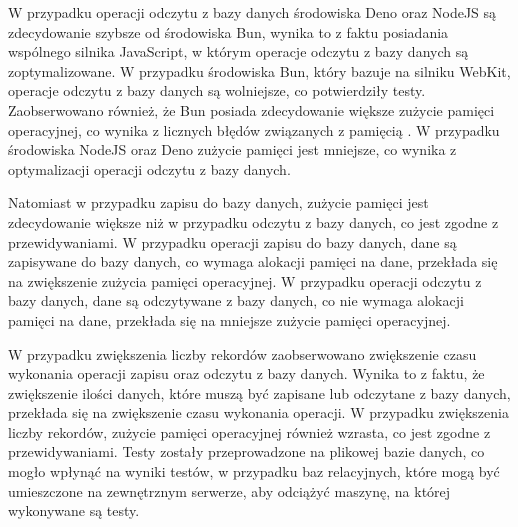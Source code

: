 W przypadku operacji odczytu z bazy danych środowiska Deno oraz NodeJS są zdecydowanie szybsze od środowiska Bun, wynika to z faktu posiadania wspólnego silnika JavaScript, w którym operacje odczytu z bazy danych są zoptymalizowane. W przypadku środowiska Bun, który bazuje na silniku WebKit, operacje odczytu z bazy danych są wolniejsze, co potwierdziły testy. Zaobserwowano również, że Bun posiada zdecydowanie większe zużycie pamięci operacyjnej, co wynika z licznych błędów związanych z pamięcią \cite{bun_memory}. W przypadku środowiska NodeJS oraz Deno zużycie pamięci jest mniejsze, co wynika z optymalizacji operacji odczytu z bazy danych.

Natomiast w przypadku zapisu do bazy danych, zużycie pamięci jest zdecydowanie większe niż w przypadku odczytu z bazy danych, co jest zgodne z przewidywaniami. W przypadku operacji zapisu do bazy danych, dane są zapisywane do bazy danych, co wymaga alokacji pamięci na dane, przekłada się na zwiększenie zużycia pamięci operacyjnej. W przypadku operacji odczytu z bazy danych, dane są odczytywane z bazy danych, co nie wymaga alokacji pamięci na dane, przekłada się na mniejsze zużycie pamięci operacyjnej.

W przypadku zwiększenia liczby rekordów zaobserwowano zwiększenie czasu wykonania operacji zapisu oraz odczytu z bazy danych. Wynika to z faktu, że zwiększenie ilości danych, które muszą być zapisane lub odczytane z bazy danych, przekłada się na zwiększenie czasu wykonania operacji. W przypadku zwiększenia liczby rekordów, zużycie pamięci operacyjnej również wzrasta, co jest zgodne z przewidywaniami. Testy zostały przeprowadzone na plikowej bazie danych, co mogło wpłynąć na wyniki testów, w przypadku baz relacyjnych, które mogą być umieszczone na zewnętrznym serwerze, aby odciążyć maszynę, na której wykonywane są testy.
